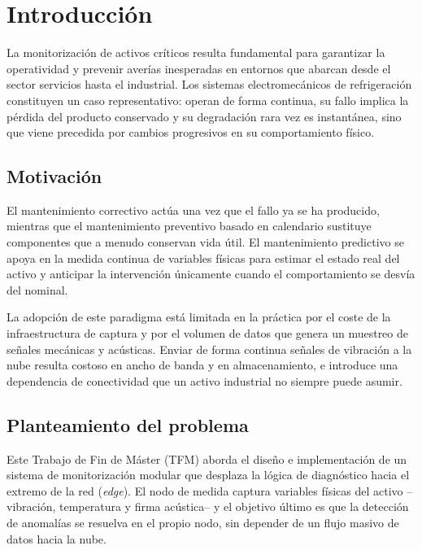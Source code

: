 \chapter{Introducción}
\label{cap:introduccion}

La monitorización de activos críticos resulta fundamental para garantizar la operatividad
y prevenir averías inesperadas en entornos que abarcan desde el sector servicios hasta el
industrial. Los sistemas electromecánicos de refrigeración constituyen un caso
representativo: operan de forma continua, su fallo implica la pérdida del producto
conservado y su degradación rara vez es instantánea, sino que viene precedida por cambios
progresivos en su comportamiento físico.

\section{Motivación}

El mantenimiento correctivo actúa una vez que el fallo ya se ha producido, mientras que el
mantenimiento preventivo basado en calendario sustituye componentes que a menudo conservan
vida útil. El mantenimiento predictivo se apoya en la medida continua de variables físicas
para estimar el estado real del activo y anticipar la intervención únicamente cuando el
comportamiento se desvía del nominal.

La adopción de este paradigma está limitada en la práctica por el coste de la
infraestructura de captura y por el volumen de datos que genera un muestreo de señales
mecánicas y acústicas. Enviar de forma continua señales de vibración a la nube resulta
costoso en ancho de banda y en almacenamiento, e introduce una dependencia de conectividad
que un activo industrial no siempre puede asumir.

\section{Planteamiento del problema}

Este Trabajo de Fin de Máster (TFM) aborda el diseño e implementación de un sistema de
monitorización modular que
desplaza la lógica de diagnóstico hacia el extremo de la red (\textit{edge}). El nodo de
medida captura variables físicas del activo --vibración, temperatura y firma acústica-- y
el objetivo último es que la detección de anomalías se resuelva en el propio nodo, sin
depender de un flujo masivo de datos hacia la nube.

